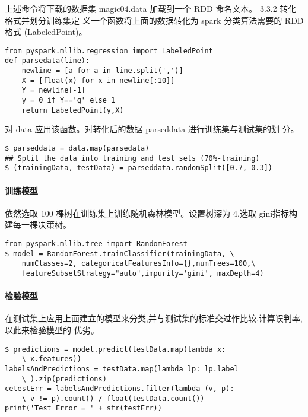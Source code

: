 上述命令将下载的数据集 magic04.data 加载到一个 RDD 命名文本。 3.3.2
转化格式并划分训练集定 义一个函数将上面的数据转化为 spark 分类算法需要的
RDD 格式 (LabeledPoint)。

\begin{lstlisting}
from pyspark.mllib.regression import LabeledPoint
def parsedata(line):
    newline = [a for a in line.split(',')]
    X = [float(x) for x in newline[:10]]
    Y = newline[-1]
    y = 0 if Y=='g' else 1
    return LabeledPoint(y,X)
\end{lstlisting}

对 data 应用该函数。对转化后的数据 parseddata 进行训练集与测试集的划
分。

\begin{lstlisting}
$ parseddata = data.map(parsedata)
## Split the data into training and test sets (70%-training)
$ (trainingData, testData) = parseddata.randomSplit([0.7, 0.3])
\end{lstlisting}

\paragraph{训练模型}\label{ux8badux7ec3ux6a21ux578b-1}

依然选取 100 棵树在训练集上训练随机森林模型。设置树深为 4,选取
gini指标构建每一棵决策树。

\begin{lstlisting}
from pyspark.mllib.tree import RandomForest
$ model = RandomForest.trainClassifier(trainingData, \
    numClasses=2, categoricalFeaturesInfo={},numTrees=100,\
    featureSubsetStrategy="auto",impurity='gini', maxDepth=4)
\end{lstlisting}

\paragraph{检验模型}\label{ux68c0ux9a8cux6a21ux578b}

在测试集上应用上面建立的模型来分类,并与测试集的标准交过作比较,计算误判率,以此来检验模型的
优劣。

\begin{lstlisting}
$ predictions = model.predict(testData.map(lambda x:
    \ x.features))
labelsAndPredictions = testData.map(lambda lp: lp.label
    \ ).zip(predictions)
cetestErr = labelsAndPredictions.filter(lambda (v, p):
    \ v != p).count() / float(testData.count())
print('Test Error = ' + str(testErr))
\end{lstlisting}

